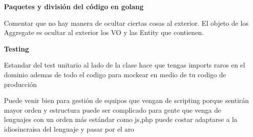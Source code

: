\textbf{Paquetes y división del código en golang}

Comentar que no hay manera de ocultar ciertas cosas al exterior. El objeto de los Aggregate es ocultar al exterior los VO y las Entity que contienen.

\textbf{Testing}

Estandar del test unitario al lado de la clase hace que tengas imports raros en el dominio ademas de todo el codigo para mockear en medio de tu codigo de producción

Puede venir bien para gestión de equipos que vengan de scripting porque sentirán mayor orden y estructura
puede ser complicado para gente que venga de lenguajes con un orden más estándar como js,php puede costar adaptarse a la idiosincraisa del lenguaje y pasar por el aro